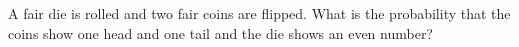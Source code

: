 A fair die is rolled and two fair coins are flipped. What is the probability that the coins show one head and one tail and the die shows an even number?
